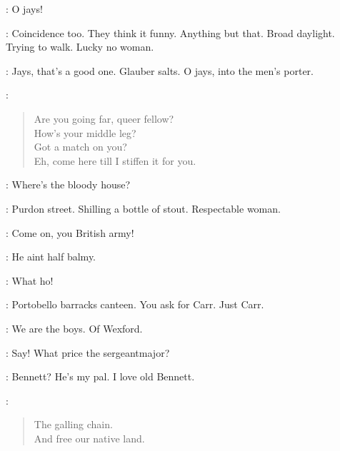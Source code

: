 \Loiterers:
O jays!


\Bloom:
Coincidence too.
They think it funny.
Anything but that.
Broad daylight.
Trying to walk.
Lucky no woman.

\Loiterers:
Jays, that's a good one.
Glauber salts.
O jays, into the men's porter.


\Whores:
\begin{verse}
%
    Are you going far, queer fellow?\\
    How's your middle leg?\\
    Got a match on you?\\
    Eh, come here till I stiffen it for you.
\end{verse}


\Navvy:
Where's the bloody house?

\Shebeenkeeper:
Purdon street.
Shilling a bottle of stout.
Respectable woman.

\Navvy:
Come on, you British army!

\Carr:
He aint half balmy.

\Compton:
What ho!

\Carr:
Portobello barracks canteen.
You ask for Carr. Just Carr.

\Navvy:
    We are the boys. Of Wexford.

\Compton:
Say! What price the sergeantmajor?

\Carr:
Bennett? He's my pal.
I love old Bennett.

\Navvy:
\begin{verse}
%
    The galling chain.\\
    And free our native land.
\end{verse}

